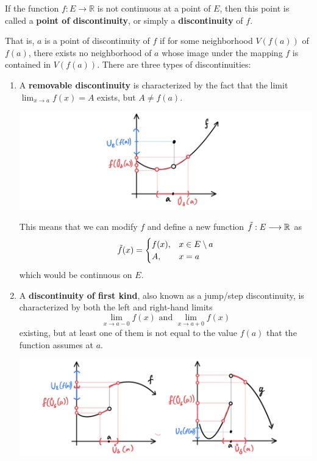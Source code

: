 \documentclass{article}
\begin{document}
    \begin{definition}[Discontinuity]
      If the function $f: E \longrightarrow \mathbb{R}$ is not continuous at a point of $E$, then this point is called a \textbf{point of discontinuity}, or simply a \textbf{discontinuity} of $f$. 

      That is, $a$ is a point of discontinuity of $f$ if for some neighborhood $V(f(a))$ of $f(a)$, there exists no neighborhood of $a$ whose image under the mapping $f$ is contained in $V(f(a))$. 
      There are three types of discontinuities: 
      \begin{enumerate}
        \item A \textbf{removable discontinuity} is characterized by the fact that the limit $\lim_{x \rightarrow a} f(x) = A$ exists, but $A \neq f(a)$. \begin{center}
            \includegraphics[scale=0.23]{img/Removable_Discontinuity.PNG}
        \end{center}
        This means that we can modify $f$ and define a new function $\Tilde{f}: E \longrightarrow \mathbb{R}$ as
        \[\Tilde{f}(x) = \begin{cases}
        f(x), & x \in E \setminus a \\
        A, & x = a
        \end{cases}\]
        which would be continuous on $E$. 
        \item A \textbf{discontinuity of first kind}, also known as a jump/step discontinuity, is characterized by both the left and right-hand limits 
        \[\lim_{x \rightarrow a-0} f(x) \text{ and } \lim_{x \rightarrow a+0} f(x)\]
        existing, but at least one of them is not equal to the value $f(a)$ that the function assumes at $a$. 
        \begin{center}
            \includegraphics[scale=0.23]{img/Discontinuity_First.PNG}

\end{center}
\end{enumerate}
\end{definition}
\end{document}
